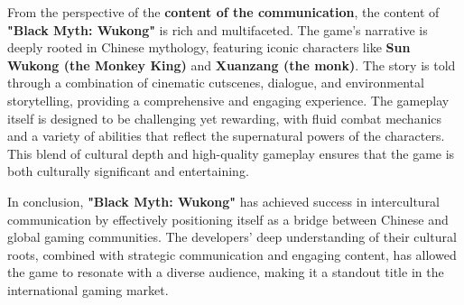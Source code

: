 From the perspective of the \textbf{content of the communication}, the content of \textbf{"Black Myth: Wukong"} is rich and multifaceted. The game's narrative is deeply rooted in Chinese mythology, featuring iconic characters like \textbf{Sun Wukong (the Monkey King)} and \textbf{Xuanzang (the monk)}. The story is told through a combination of cinematic cutscenes, dialogue, and environmental storytelling, providing a comprehensive and engaging experience. The gameplay itself is designed to be challenging yet rewarding, with fluid combat mechanics and a variety of abilities that reflect the supernatural powers of the characters. This blend of cultural depth and high-quality gameplay ensures that the game is both culturally significant and entertaining.

In conclusion, \textbf{"Black Myth: Wukong"} has achieved success in intercultural communication by effectively positioning itself as a bridge between Chinese and global gaming communities. The developers' deep understanding of their cultural roots, combined with strategic communication and engaging content, has allowed the game to resonate with a diverse audience, making it a standout title in the international gaming market.